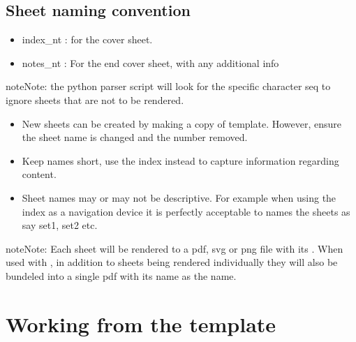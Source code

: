 \documentclass[letterpaper,10pt,english]{sphinxmanual}
\let\sphinxpxdimen\pdfpxdimen\else\newdimen\sphinxpxdimen
\begin{document}
\subsection{Sheet naming convention}
\label{\detokenize{walkthrough:sheet-naming-convention}}\begin{itemize}
\item {} 
index\_nt : for the cover sheet.

\item {} 
notes\_nt : For the end cover sheet, with any additional info

\end{itemize}

\begin{sphinxadmonition}{note}{Note:}
the python parser script will look for the specific character seq 
to ignore sheets that are not to be rendered.
\end{sphinxadmonition}
\begin{itemize}
\item {} 
New sheets can be created by making a copy of template. However, ensure the
sheet name is changed and the number removed.

\item {} 
Keep names short, use the index instead to capture information regarding
content.

\item {} 
Sheet names may or may not be descriptive. For example when using the index
as a navigation device it is perfectly acceptable to names the sheets as
say set1, set2 etc.

\end{itemize}

\begin{sphinxadmonition}{note}{Note:}
Each sheet will be rendered to a pdf, svg or png file with its .  When used with , in addition to sheets being rendered
individually they will also be bundeled into a single pdf with its name as
the  name.
\end{sphinxadmonition}


\section{Working from the template}
\label{\detokenize{walkthrough:working-from-the-template}}
\noindent{\hspace*{\fill}\sphinxincludegraphics[width=640\sphinxpxdimen,height=640\sphinxpxdimen]{{template1}.png}\hspace*{\fill}}
\end{document}
